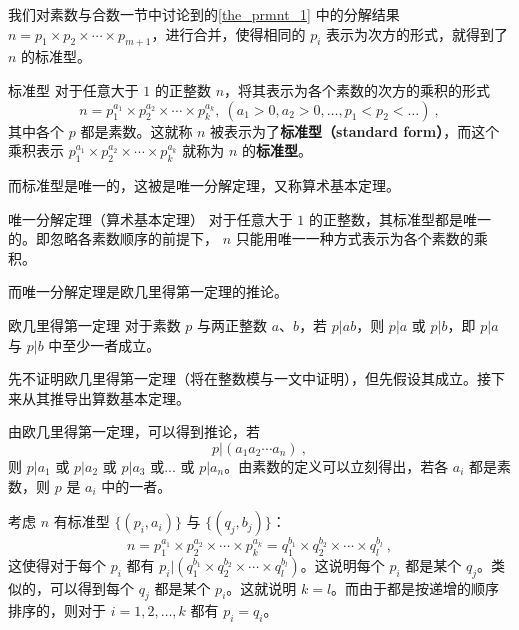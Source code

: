 
我们对素数与合数一节中讨论到的\autoref{the_prmnt_1} 中的分解结果 $n = p_1 \times p_2\times \cdots \times p_{m+1}$，进行合并，使得相同的 $p_i$ 表示为次方的形式，就得到了 $n$ 的标准型。
\begin{definition}{标准型}
对于任意大于 $1$ 的正整数 $n$，将其表示为各个素数的次方的乘积的形式
\begin{equation}
n = p_1^{a_1} \times p_2^{a_2} \times \cdots \times p_k^{a_k}, ~ (a_1 > 0, a_2 > 0 , \dots, p_1 < p_2<\dots) ~,
\end{equation}
其中各个 $p$ 都是素数。这就称 $n$ 被表示为了\textbf{标准型（standard form）}，而这个乘积表示 $p_1^{a_1} \times p_2^{a_2} \times \cdots \times p_k^{a_k}$ 就称为 $n$ 的\textbf{标准型}。
\end{definition}

而标准型是唯一的，这被是唯一分解定理，又称算术基本定理。
\begin{theorem}{唯一分解定理（算术基本定理）}
对于任意大于 $1$ 的正整数，其标准型都是唯一的。即忽略各素数顺序的前提下， $n$ 只能用唯一一种方式表示为各个素数的乘积。
\end{theorem}

而唯一分解定理是欧几里得第一定理的推论。
\begin{theorem}{欧几里得第一定理}\label{the_stafnt_1}
对于素数 $p$ 与两正整数 $a$、$b$，若 $p|ab$，则 $p|a$ 或 $p|b$，即 $p|a$ 与 $p|b$ 中至少一者成立。
\end{theorem}

先不证明欧几里得第一定理（将在整数模与一文中证明），但先假设其成立。接下来从其推导出算数基本定理。

由欧几里得第一定理，可以得到推论，若
\begin{equation}
p | (a_1 a_2 \cdots a_n) ~,
\end{equation}
则 $p | a_1$ 或 $p | a_2$ 或 $p|a_3$ 或... 或 $p|a_n$。由素数的定义可以立刻得出，若各 $a_i$ 都是素数，则 $p$ 是 $a_i$ 中的一者。

考虑 $n$ 有标准型 $\{(p_i, a_i)\}$ 与  $\{(q_j, b_j)\}$：
\begin{equation}
n = p_1^{a_1}\times p_2^{a_2} \times \cdots \times p_k^{a_k} = q_1^{b_1} \times q_2^{b_2} \times \cdots \times q_l^{b_l} ~,
\end{equation}
这使得对于每个 $p_i$ 都有 $p_i | (q_1^{b_1} \times q_2^{b_2} \times \cdots \times q_l^{b_l})$。这说明每个 $p_i$ 都是某个 $q_j$。类似的，可以得到每个 $q_j$ 都是某个 $p_i$。这就说明 $k = l$。而由于都是按递增的顺序排序的，则对于 $i = 1,2,\dots, k$ 都有 $p_i = q_i$。

